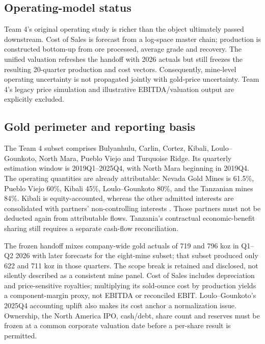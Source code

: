 \subsection{Operating-model status}
Team 4's original operating study is richer than the object ultimately passed downstream. Cost of Sales is forecast from a log-space master chain; production is constructed bottom-up from ore processed, average grade and recovery. The unified valuation refreshes the handoff with 2026 actuals but still freezes the resulting 20-quarter production and cost vectors. Consequently, mine-level operating uncertainty is not propagated jointly with gold-price uncertainty. Team 4's legacy price simulation and illustrative EBITDA/valuation output are explicitly excluded.

\subsection{Gold perimeter and reporting basis}
The Team 4 subset comprises Bulyanhulu, Carlin, Cortez, Kibali, Loulo--Gounkoto, North Mara, Pueblo Viejo and Turquoise Ridge. Its quarterly estimation window is 2019Q1--2025Q4, with North Mara beginning in 2019Q4. The operating quantities are already attributable: Nevada Gold Mines is 61.5\%, Pueblo Viejo 60\%, Kibali 45\%, Loulo--Gounkoto 80\%, and the Tanzanian mines 84\%. Kibali is equity-accounted, whereas the other admitted interests are consolidated with partners' non-controlling interests \citep{barrickar2025}. Those partners must not be deducted again from attributable flows. Tanzania's contractual economic-benefit sharing still requires a separate cash-flow reconciliation.

The frozen handoff mixes company-wide gold actuals of 719 and 796 koz in Q1--Q2 2026 with later forecasts for the eight-mine subset; that subset produced only 622 and 711 koz in those quarters. The scope break is retained and disclosed, not silently described as a consistent mine panel. Cost of Sales includes depreciation and price-sensitive royalties; multiplying its sold-ounce cost by production yields a component-margin proxy, not EBITDA or reconciled EBIT. Loulo--Gounkoto's 2025Q4 accounting uplift also makes its cost anchor a normalization issue. Ownership, the North America IPO, cash/debt, share count and reserves must be frozen at a common corporate valuation date before a per-share result is permitted.

